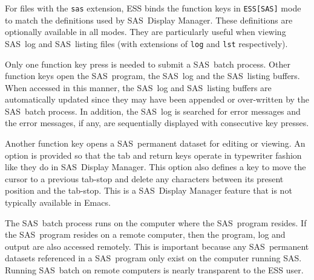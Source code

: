 \documentclass{article}
\newcommand*{\SAS}{\textsc{SAS}}
\newcommand{\stexttt}[1]{{\small\texttt{#1}}}
\newenvironment{Comment}{\begin{quote}\small\itshape }{\end{quote}}
\begin{document}
For files with the \stexttt{sas} extension, ESS binds the function
keys in \stexttt{ESS[SAS]} mode to match the definitions used by \SAS\ 
Display Manager.  These definitions are optionally available in all
modes.   They are particularly useful when viewing \SAS\ log and \SAS\ listing
files (with extensions of \stexttt{log} and \stexttt{lst}
respectively).

Only one function key press is needed to submit a \SAS\ batch process.
Other function keys open the \SAS\ program, the \SAS\ log and the
\SAS\ listing buffers.  When accessed in this manner, the \SAS\ log and 
\SAS\ listing buffers are automatically updated since they may have 
been appended or over-written
by the \SAS\ batch process.  In addition, the \SAS\ log is searched for error
messages and the error messages, if any, are sequentially displayed
with consecutive key presses.

Another function key opens a \SAS\ permanent dataset for editing or
viewing.  An option is provided so that the tab and return keys
operate in typewriter fashion like they do in \SAS\ Display Manager.
This option also defines a key to move the cursor to a previous
tab-stop and delete any characters between its present position and
the tab-stop.  This is a \SAS\ Display Manager feature that is not
typically available in Emacs.

The \SAS\ batch process runs on the computer where the \SAS\ program
resides.  If the \SAS\ program resides on a remote computer, then the
program, log and output are also accessed remotely.
This is important because any \SAS\ permanent datasets referenced in a
\SAS\ program only exist on the computer running \SAS.
Running \SAS\ batch on remote computers is nearly transparent to the
ESS user.


\end{document}
